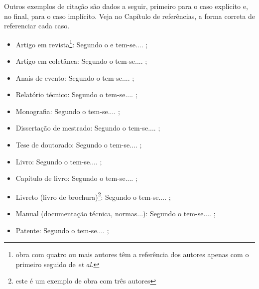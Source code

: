 \documentclass{templateppgmo}
\numberwithin{figure}{chapter}
\numberwithin{table}{chapter}
\numberwithin{quadro}{chapter}
\numberwithin{algoritmo}{chapter}
\numberwithin{codigo}{chapter}
\begin{document}
  	Outros exemplos de citação são dados a seguir, primeiro para o caso explícito e, no final, para o caso implícito. Veja no Capítulo de referências, a forma correta de referenciar cada caso.

  	\begin{itemize}
  	\item Artigo em revista\footnote{obra com quatro ou mais autores têm a referência dos autores apenas com o primeiro seguido de \textit{et al.}}: Segundo o  e  tem-se.... \cite{silva:artigo,artigo1};

  	\item Artigo em coletânea: Segundo o  tem-se.... \cite{silva:incollection};

  	\item Anais de evento: Segundo o  tem-se.... \cite{silva:inproceedings};

  	\item Relatório técnico: Segundo o  tem-se.... \cite{silva:tech};

  	\item Monografia: Segundo o  tem-se.... \cite{silva:monography};

  	\item Dissertação de mestrado: Segundo o  tem-se.... \cite{silva:master};

  	\item Tese de doutorado: Segundo o  tem-se.... \cite{barcelos1998};

  	
  	\item Livro: Segundo o  tem-se.... \cite{wazlawick:2009};


  	\item Capítulo de livro: Segundo o  tem-se.... \cite{silva:inbook};

  	\item Livreto (livro de brochura)\footnote{este é um exemplo de obra com três autores}: Segundo o  tem-se.... \cite{silva:booklet};

  	\item Manual (documentação técnica, normas...): Segundo o  tem-se.... \cite{NBR6023:2000};

  	\item Patente: Segundo o  tem-se.... \cite{cruvinel1989};


\end{itemize}
\end{document}
